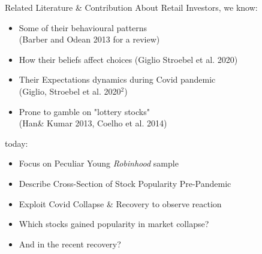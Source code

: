 \documentclass[10pt]{beamer}
\begin{document}
\begin{frame}{Related Literature \& Contribution}
About Retail Investors, we know: \pause
\begin{itemize}[<+->]
\item Some of their behavioural patterns \\ (Barber and Odean 2013 for a review)
\item How their beliefs affect choices (Giglio Stroebel et al. 2020)
\item Their Expectations dynamics during Covid pandemic  \\ (Giglio, Stroebel et al. 2020$^2$)
\item Prone to gamble on "lottery stocks" \\ (Han\& Kumar 2013, Coelho et al. 2014)
\end{itemize}

\pause
today:
\begin{itemize}[<+->]
\item Focus on Peculiar Young \textit{Robinhood} sample
\item Describe Cross-Section of Stock Popularity Pre-Pandemic 
\item Exploit Covid Collapse \& Recovery to observe reaction
\item Which stocks gained popularity in market collapse?
\item And in the recent recovery?
\end{itemize}

\end{frame}
\end{document}
